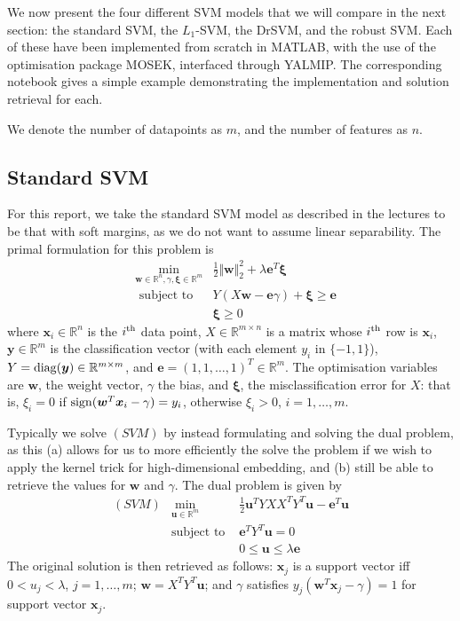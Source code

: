 \documentclass[11pt]{article}
\newcommand{\ds}{\displaystyle}
\begin{document}
We now present the four different SVM models that we will compare in the next section: the standard SVM, the $L_1$-SVM, the DrSVM, and the robust SVM. Each of these have been implemented from scratch in MATLAB, with the use of the optimisation package MOSEK, interfaced through YALMIP. The corresponding notebook gives a simple example demonstrating the implementation and solution retrieval for each. 

We denote the number of datapoints as $m$, and the number of features as $n$. 

\subsection{Standard SVM}

For this report, we take the standard SVM model as described in the lectures to be that with soft margins, as we do not want to assume linear separability. The primal formulation for this problem is
\begin{eqnarray*}
& \ds \min_{\pmb{w}\in\mathbb{R}^n,\gamma,\pmb{\xi}\in\mathbb{R}^m} & \frac{1}{2}\Vert \bm{w} \Vert_2^2  + \lambda\bm{e}^T\bm{\xi} 
\\
& \mbox{ subject to } & Y(X\bm{w} - \bm{e}\gamma) + \bm{\xi} \geq \bm{e} 
\\
& & \bm{\xi} \geq 0
\end{eqnarray*}
where $\bm{x}_i\in\mathbb{R}^n$ is the $i^{\rm th}$ data point, $X\in\mathbb{R}^{m\times n}$ is a matrix whose $i^{\rm th}$ row is $\bm{x}_i$, $\bm{y}\in\mathbb{R}^m$ is the classification vector (with each element $y_i$ in $\{-1, 1\}$), $Y = {\rm diag}(\bm{y})\in\mathbb{R}^{m\times m}$, and $\bm{e} = (1, 1, \dots, 1)^T\in\mathbb{R}^{m}$. The optimisation variables are $\bm{w}$, the weight vector, $\gamma$ the bias, and $\bm{\xi}$, the misclassification error for $X$: that is, $\xi_i = 0$ if ${\rm sign}(\bm{w}^T\bm{x}_i - \gamma) = y_i$, otherwise $\xi_i > 0$, $i=1,\dots,m$. 

Typically we solve $(SVM)$ by instead formulating and solving the dual problem, as this (a) allows for us to more efficiently the solve the problem if we wish to apply the kernel trick for high-dimensional embedding, and (b) still be able to retrieve the values for $\bm{w}$ and $\gamma$. The dual problem is given by
\begin{eqnarray*}
(SVM) & \ds\min_{\pmb{u}\in\mathbb{R}^m} & \frac{1}{2} \bm{u}^TYXX^TY^T\bm{u} - \bm{e}^T\bm{u}
\\
& \mbox{subject to } & \bm{e}^TY^T\bm{u} = 0
\\
& & 0 \leq \bm{u} \leq \lambda\bm{e}
\end{eqnarray*}
The original solution is then retrieved as follows: $\bm{x}_j$ is a support vector iff $0 < u_j < \lambda$, $j=1,\dots,m$; $\bm{w} = X^TY^T\bm{u}$; and $\gamma$ satisfies $y_j(\bm{w}^T\bm{x}_j - \gamma) = 1$ for support vector $\bm{x}_j$. 
\end{document}
